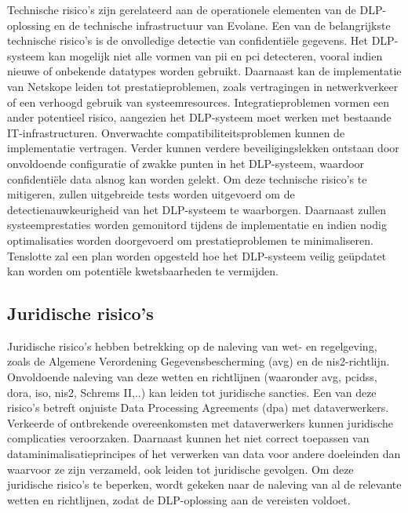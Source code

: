 Technische risico's zijn gerelateerd aan de operationele elementen van de DLP-oplossing en de technische infrastructuur van Evolane.
Een van de belangrijkste technische risico's is de onvolledige detectie van confidentiële gegevens. 
Het DLP-systeem kan mogelijk niet alle vormen van \gls{pii} en \gls{pci} detecteren, vooral indien nieuwe of onbekende datatypes worden gebruikt.
Daarnaast kan de implementatie van Netskope leiden tot prestatieproblemen, zoals vertragingen in netwerkverkeer of een verhoogd gebruik van systeemresources.
Integratieproblemen vormen een ander potentieel risico, aangezien het DLP-systeem moet werken met bestaande IT-infrastructuren.
Onverwachte compatibiliteitsproblemen kunnen de implementatie vertragen. Verder kunnen verdere beveiligingslekken ontstaan 
door onvoldoende configuratie of zwakke punten in het DLP-systeem, waardoor confidentiële data alsnog kan worden gelekt.
Om deze technische risico's te mitigeren, zullen uitgebreide tests worden uitgevoerd om de detectienauwkeurigheid van het DLP-systeem te waarborgen.
Daarnaast zullen systeemprestaties worden gemonitord tijdens de implementatie en indien nodig optimalisaties worden doorgevoerd om prestatieproblemen te minimaliseren.
Tenslotte zal een plan worden opgesteld hoe het DLP-systeem veilig geüpdatet kan worden om potentiële kwetsbaarheden te vermijden.

\subsection{Juridische risico's}

Juridische risico's hebben betrekking op de naleving van wet- en regelgeving, zoals de Algemene Verordening Gegevensbescherming (\gls{avg}) en de \gls{nis2}-richtlijn.
Onvoldoende naleving van deze wetten en richtlijnen (waaronder \gls{avg}, \gls{pcidss}, \gls{dora}, \gls{iso}, \gls{nis2}, Schrems II,..) kan leiden tot juridische sancties. 
Een van deze risico's betreft onjuiste Data Processing Agreements (\gls{dpa}) met dataverwerkers.
Verkeerde of ontbrekende overeenkomsten met dataverwerkers kunnen juridische complicaties veroorzaken. 
Daarnaast kunnen het niet correct toepassen van dataminimalisatieprincipes of het verwerken van data voor andere doeleinden dan waarvoor ze zijn verzameld, 
ook leiden tot juridische gevolgen. 
Om deze juridische risico's te beperken, wordt gekeken naar de naleving van al de relevante wetten en richtlijnen, zodat de DLP-oplossing aan de vereisten voldoet.

